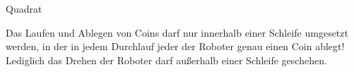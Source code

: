 \documentclass{../tuda-exercise}
\begin{document}
\begin{task}[credit=\stars{2}{3}]{Quadrat}
    \begin{note}[title=Verbindliche Anforderung:, color=tuda-orange]
      Das Laufen und Ablegen von Coins darf nur innerhalb einer Schleife umgesetzt werden, in der
      in jedem Durchlauf jeder der Roboter genau einen Coin ablegt! Lediglich das Drehen der
      Roboter darf außerhalb einer Schleife geschehen.
    \end{note}

    \clearpagesolution

    \begin{solution}
      
    \end{solution}
  \end{task}
\end{document}
